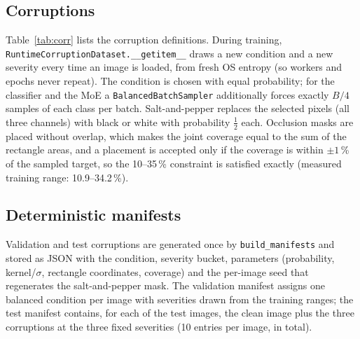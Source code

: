 \documentclass[conference]{IEEEtran}
\begin{document}
\subsection{Corruptions}
Table~\ref{tab:corr} lists the corruption definitions. During training, \texttt{RuntimeCorruptionDataset.\_\_getitem\_\_} draws a new condition and a new severity every time an image is loaded, from fresh OS entropy (so workers and epochs never repeat). The condition is chosen with equal probability; for the classifier and the MoE a \texttt{BalancedBatchSampler} additionally forces exactly $B/4$ samples of each class per batch. Salt-and-pepper replaces the selected pixels (all three channels) with black or white with probability $\tfrac12$ each. Occlusion masks are placed without overlap, which makes the joint coverage equal to the sum of the rectangle areas, and a placement is accepted only if the coverage is within $\pm1$\,\% of the sampled target, so the 10--35\,\% constraint is satisfied exactly (measured training range: 10.9--34.2\,\%).

\begin{table}[t]
\centering
\caption{Corruption configuration}
\label{tab:corr}
\end{table}

\subsection{Deterministic manifests}
Validation and test corruptions are generated once by \texttt{build\_manifests} and stored as JSON with the condition, severity bucket, parameters (probability, kernel/$\sigma$, rectangle coordinates, coverage) and the per-image seed that regenerates the salt-and-pepper mask. The validation manifest assigns one balanced condition per image with severities drawn from the training ranges; the test manifest contains, for each of the \NTEST{} test images, the clean image plus the three corruptions at the three fixed severities (10 entries per image, \NTESTENTRIES{} in total).
\end{document}
